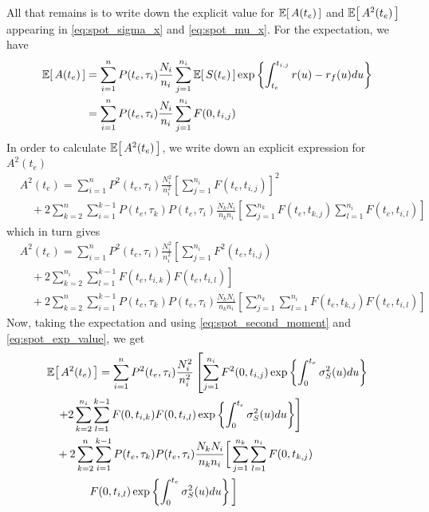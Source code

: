 All that remains is to write down the explicit value for $\Ex{A(t_e)}$ and $\Ex{A^2(t_e)}$ appearing in \eqref{eq:spot_sigma_x} and \eqref{eq:spot_mu_x}. For the expectation, we have
\begin{equation}
\begin{split}
\Ex{A(t_e)} &= \sum_{i=1}^{n} P(t_e, \tau_i) \frac{N_i}{n_i} \sum_{j=1}^{n_i} \Ex{S(t_e)} \exp \left\{ \int_{t_e}^{t_{i,j}} r(u) - r_f(u) du \right\} \\
            &= \sum_{i=1}^{n} P(t_e, \tau_i) \frac{N_i}{n_i} \sum_{j=1}^{n_i} F(0, t_{i,j})
\end{split}
\end{equation}
In order to calculate $\Ex{A^2(t_e)}$, we write down an explicit expression for $A^2(t_e)$
\begin{equation}
\begin{split}
& A^2(t_e) = \sum_{i=1}^{n} P^2(t_e, \tau_i) \frac{N^2_i}{n^2_i} \left[ \sum_{j=1}^{n_i} F(t_e, t_{i,j}) \right]^2 \\
         &\quad + 2 \sum_{k=2}^{n} \sum_{i=1}^{k-1} P(t_e, \tau_k) P(t_e, \tau_i) \frac{N_k N_i}{n_k n_i} \left[ \sum_{j=1}^{n_k} F(t_e, t_{k,j}) \sum_{l=1}^{n_i} F(t_e, t_{i,l}) \right]
\end{split}
\end{equation}
which in turn gives
\begin{equation}
\label{eq:spot_A_te_2}
\begin{split}
& A^2(t_e) = \sum_{i=1}^{n} P^2(t_e, \tau_i) \frac{N^2_i}{n^2_i} \left[ \sum_{j=1}^{n_i} F^2(t_e, t_{i,j}) \right. \\
         &\quad + \left. 2 \sum_{k=2}^{n_i} \sum_{l=1}^{k-1} F(t_e, t_{i,k}) F(t_e, t_{i,l}) \right] \\
         &\quad + 2 \sum_{k=2}^{n} \sum_{i=1}^{k-1} P(t_e, \tau_k) P(t_e, \tau_i) \frac{N_k N_i}{n_k n_i} \left[ \sum_{j=1}^{n_k} \sum_{l=1}^{n_i} F(t_e, t_{k,j}) F(t_e, t_{i,l}) \right]
\end{split}
\end{equation}
Now, taking the expectation and using \eqref{eq:spot_second_moment} and \eqref{eq:spot_exp_value}, we get
\begin{equation}
\begin{split}
& \Ex{A^2(t_e)} = \sum_{i=1}^{n} P^2(t_e, \tau_i) \frac{N^2_i}{n^2_i} \left[ \sum_{j=1}^{n_i} F^2(0, t_{i,j}) \exp \left\{ \int_0^{t_e} \sigma^2_S(u) du \right\} \right. \\
              &\quad \left. + 2 \sum_{k=2}^{n_i} \sum_{l=1}^{k-1} F(0, t_{i,k}) F(0, t_{i,l}) \exp \left\{ \int_0^{t_e} \sigma^2_S(u) du \right\} \right] \\
              &\quad + 2 \sum_{k=2}^{n} \sum_{i=1}^{k-1} P(t_e, \tau_k) P(t_e, \tau_i) \frac{N_k N_i}{n_k n_i} \bigg[ \sum_{j=1}^{n_k} \sum_{l=1}^{n_i} F(0, t_{k,j}) \bigg. \\
              &\qquad \qquad \bigg. F(0, t_{i,l}) \exp \left\{ \int_0^{t_e} \sigma^2_S(u) du \right\} \bigg]
\end{split}
\end{equation}

